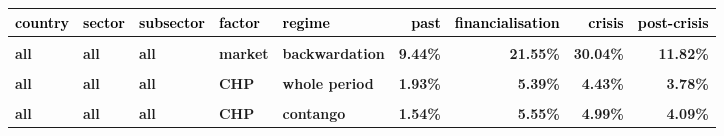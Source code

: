 \documentclass[
  authoryear,
  preprint,
  3p]{elsarticle}
\begin{document}
\begin{landscape}
\begin{longtable}[t]{>{}l>{}l>{}l>{}l>{}l>{}r>{}r>{}r>{}r}
\toprule
\textcolor{black}{\textbf{country}} & \textcolor{black}{\textbf{sector}} & \textcolor{black}{\textbf{subsector}} & \textcolor{black}{\textbf{factor}} & \textcolor{black}{\textbf{regime}} & \textcolor{black}{\textbf{past}} & \textcolor{black}{\textbf{financialisation}} & \textcolor{black}{\textbf{crisis}} & \textcolor{black}{\textbf{post-crisis}}\\
\midrule
\textbf{\cellcolor{gray!10}{all}} & \textbf{\cellcolor{gray!10}{all}} & \textbf{\cellcolor{gray!10}{all}} & \textbf{\cellcolor{gray!10}{market}} & \textbf{\cellcolor{gray!10}{whole period}} & \textcolor[HTML]{4285f4}{\textbf{\cellcolor{gray!10}{9.69\%}}} & \textcolor[HTML]{4285f4}{\textbf{\cellcolor{gray!10}{19.7\%}}} & \textcolor[HTML]{4285f4}{\textbf{\cellcolor{gray!10}{31.3\%}}} & \textcolor[HTML]{4285f4}{\textbf{\cellcolor{gray!10}{14.73\%}}}\\
\textbf{all} & \textbf{all} & \textbf{all} & \textbf{market} & \textbf{backwardation} & \textcolor[HTML]{4285f4}{\textbf{9.44\%}} & \textcolor[HTML]{4285f4}{\textbf{21.55\%}} & \textcolor[HTML]{4285f4}{\textbf{30.04\%}} & \textcolor[HTML]{4285f4}{\textbf{11.82\%}}\\
\textbf{\cellcolor{gray!10}{all}} & \textbf{\cellcolor{gray!10}{all}} & \textbf{\cellcolor{gray!10}{all}} & \textbf{\cellcolor{gray!10}{market}} & \textbf{\cellcolor{gray!10}{contango}} & \textcolor[HTML]{4285f4}{\textbf{\cellcolor{gray!10}{10.07\%}}} & \textcolor[HTML]{4285f4}{\textbf{\cellcolor{gray!10}{18.15\%}}} & \textcolor[HTML]{4285f4}{\textbf{\cellcolor{gray!10}{32.67\%}}} & \textcolor[HTML]{4285f4}{\textbf{\cellcolor{gray!10}{16.99\%}}}\\
\textbf{all} & \textbf{all} & \textbf{all} & \textbf{CHP} & \textbf{whole period} & \textcolor[HTML]{4285f4}{\textbf{1.93\%}} & \textcolor[HTML]{4285f4}{\textbf{5.39\%}} & \textcolor[HTML]{4285f4}{\textbf{4.43\%}} & \textcolor[HTML]{4285f4}{\textbf{3.78\%}}\\
\textbf{\cellcolor{gray!10}{all}} & \textbf{\cellcolor{gray!10}{all}} & \textbf{\cellcolor{gray!10}{all}} & \textbf{\cellcolor{gray!10}{CHP}} & \textbf{\cellcolor{gray!10}{backwardation}} & \textcolor[HTML]{4285f4}{\textbf{\cellcolor{gray!10}{2.6\%}}} & \textcolor[HTML]{4285f4}{\textbf{\cellcolor{gray!10}{5.61\%}}} & \textcolor[HTML]{4285f4}{\textbf{\cellcolor{gray!10}{4\%}}} & \textcolor[HTML]{4285f4}{\textbf{\cellcolor{gray!10}{4.57\%}}}\\
\addlinespace
\textbf{all} & \textbf{all} & \textbf{all} & \textbf{CHP} & \textbf{contango} & \textcolor[HTML]{4285f4}{\textbf{1.54\%}} & \textcolor[HTML]{4285f4}{\textbf{5.55\%}} & \textcolor[HTML]{4285f4}{\textbf{4.99\%}} & \textcolor[HTML]{4285f4}{\textbf{4.09\%}}\\

\end{longtable}
\end{landscape}
\end{document}

